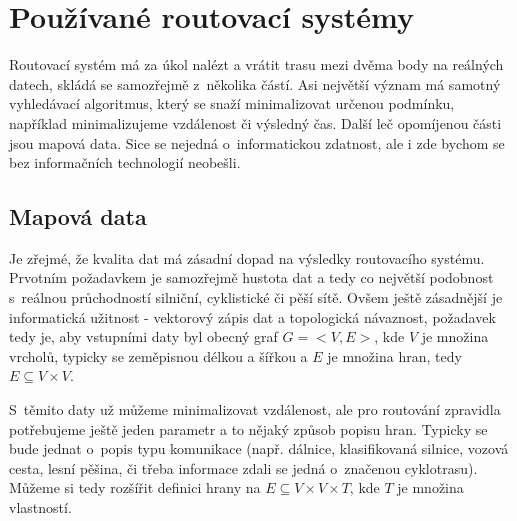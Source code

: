 \documentclass[thesis=B,czech]{FITthesis}[2012/06/26]
\begin{document}
\chapter{Používané routovací systémy}
Routovací systém má za úkol nalézt a vrátit trasu mezi dvěma body na reálných datech, skládá se samozřejmě z~několika částí. Asi největší význam má samotný vyhledávací algoritmus, který se snaží minimalizovat určenou podmínku, například minimalizujeme vzdálenost či výsledný čas. Další leč opomíjenou části jsou mapová data. Sice se nejedná o~informatickou zdatnost, ale i zde bychom se bez informačních technologií neobešli. 


\section{Mapová data}

Je zřejmé, že kvalita dat má zásadní dopad na výsledky routovacího systému. Prvotním požadavkem je samozřejmě hustota dat a tedy co největší podobnost s~reálnou průchodností silniční, cyklistické či pěší sítě. Ovšem ještě zásadnější je informatická užitnost - vektorový zápis dat a topologická návaznost, požadavek tedy je, aby vstupními daty byl obecný graf $G = <V,E>$, kde $V$ je množina vrcholů, typicky se zeměpisnou délkou a šířkou a $E$ je množina hran, tedy $ E \subseteq V \times V $. 

S~těmito daty už můžeme minimalizovat vzdálenost, ale pro routování zpravidla potřebujeme ještě jeden parametr a to nějaký způsob popisu hran. Typicky se bude jednat o~popis typu komunikace (např. dálnice, klasifikovaná silnice, vozová cesta, lesní pěšina, či třeba informace zdali se jedná o~značenou cyklotrasu). Můžeme si tedy rozšířit definici hrany na $E \subseteq V \times V \times T$, kde $T$ je množina vlastností.
\end{document}
